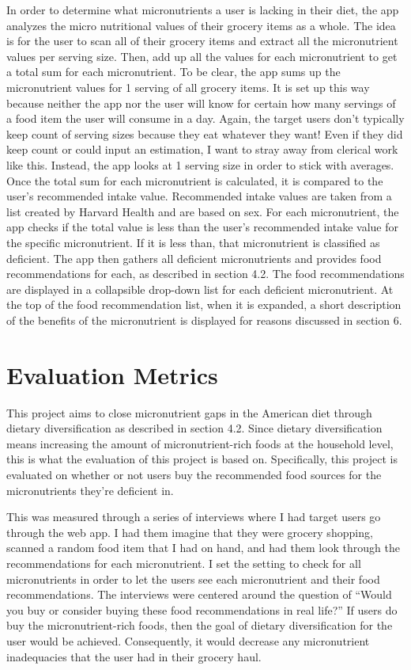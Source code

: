 \documentclass[10pt,twocolumn]{article}
\begin{document}
In order to determine what micronutrients a user is lacking in their diet, the app analyzes the micro nutritional values of their grocery items as a whole. The idea is for the user to scan all of their grocery items and extract all the micronutrient values per serving size. Then, add up all the values for each micronutrient to get a total sum for each micronutrient. To be clear, the app sums up the micronutrient values for 1 serving of all grocery items. It is set up this way because neither the app nor the user will know for certain how many servings of a food item the user will consume in a day. Again, the target users don’t typically keep count of serving sizes because they eat whatever they want! Even if they did keep count or could input an estimation, I want to stray away from clerical work like this. Instead, the app looks at 1 serving size in order to stick with averages. Once the total sum for each micronutrient is calculated, it is compared to the user’s recommended intake value. Recommended intake values are taken from a list created by Harvard Health and are based on sex.\cite{harvard_health_2020} For each micronutrient, the app checks if the total value is less than the user’s recommended intake value for the specific micronutrient. If it is less than, that micronutrient is classified as deficient. The app then gathers all deficient micronutrients and provides food recommendations for each, as described in section 4.2. The food recommendations are displayed in a collapsible drop-down list for each deficient micronutrient. At the top of the food recommendation list, when it is expanded, a short description of the benefits of the micronutrient is displayed for reasons discussed in section 6. 


\section{Evaluation Metrics}

This project aims to close micronutrient gaps in the American diet through dietary diversification as described in section 4.2. Since dietary diversification means increasing the amount of micronutrient-rich foods at the household level, this is what the evaluation of this project is based on. Specifically, this project is evaluated on whether or not users buy the recommended food sources for the micronutrients they’re deficient in.

This was measured through a series of interviews where I had target users go through the web app. I had them imagine that they were grocery shopping, scanned a random food item that I had on hand, and had them look through the recommendations for each micronutrient. I set the setting to check for all micronutrients in order to let the users see each micronutrient and their food recommendations. The interviews were centered around the question of “Would you buy or consider buying these food recommendations in real life?” If users do buy the micronutrient-rich foods, then the goal of dietary diversification for the user would be achieved. Consequently, it would decrease any micronutrient inadequacies that the user had in their grocery haul. 
\end{document}
